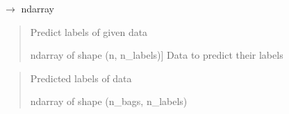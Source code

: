 \documentclass[letterpaper,10pt,english]{sphinxmanual}
\begin{document}
\begin{fulllineitems}
\begin{fulllineitems}
\begin{quote}
\begin{description}
\end{description}\end{quote}

\end{fulllineitems}


\begin{fulllineitems}
\label{\detokenize{classifier/_autosummary/miml.classifier.miml_classifier.MIMLClassifier:miml.classifier.miml_classifier.MIMLClassifier.predict}}
\pysigstartsignatures
\pysiglinewithargsret
{}
{}
{{ $\rightarrow$ ndarray}}
\pysigstopsignatures\begin{quote}

\sphinxAtStartPar
Predict labels of given data
\begin{description}
\sphinxlineitem{x}{[}ndarray of shape (n, n\_labels){]}
\sphinxAtStartPar
Data to predict their labels

\end{description}
\end{quote}
\begin{quote}\begin{description}
\sphinxAtStartPar
{} \textendash{} Predicted labels of data

\sphinxAtStartPar
ndarray of shape (n\_bags, n\_labels)

\end{description}\end{quote}

\end{fulllineitems}



\end{fulllineitems}
\end{document}
